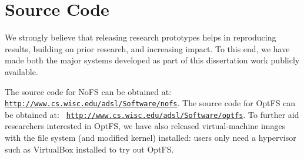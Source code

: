 \section{Source Code}
\label{sec-appendix-source}

We strongly believe that releasing research prototypes helps in
reproducing results, building on prior research, and increasing
impact. To this end, we have made both the major systems developed as
part of this dissertation work publicly available.

The source code for NoFS can be obtained at: \hspace*{-0pt}\texttt{
  \url{http://www.cs.wisc.edu/adsl/Software/nofs}}. The source code
for OptFS can be obtained at: \hspace*{-0pt}\texttt{
  \url{http://www.cs.wisc.edu/adsl/Software/optfs}}. To further aid
researchers interested in OptFS, we have also released virtual-machine
images with the file system (and modified kernel) installed: users
only need a hypervisor such as VirtualBox installed to try out OptFS.

